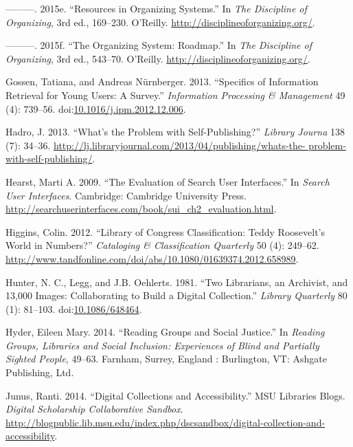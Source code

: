 \documentclass[]{article}
\begin{document}
\hypertarget{ref-glushkoux5fresourcesux5f2015}{}
---------. 2015e. ``Resources in Organizing Systems.'' In \emph{The
Discipline of Organizing}, 3rd ed., 169--230. O'Reilly.
\url{http://disciplineoforganizing.org/}.

\hypertarget{ref-glushkoux5forganizingux5f2015}{}
---------. 2015f. ``The Organizing System: Roadmap.'' In \emph{The
Discipline of Organizing}, 3rd ed., 543--70. O'Reilly.
\url{http://disciplineoforganizing.org/}.

\hypertarget{ref-gossenux5fspecificsux5f2013}{}
Gossen, Tatiana, and Andreas Nürnberger. 2013. ``Specifics of
Information Retrieval for Young Users: A Survey.'' \emph{Information
Processing \& Management} 49 (4): 739--56.
doi:\href{https://doi.org/10.1016/j.ipm.2012.12.006}{10.1016/j.ipm.2012.12.006}.

\hypertarget{ref-hadroux5fwhatsux5f2013}{}
Hadro, J. 2013. ``What's the Problem with Self-Publishing?''
\emph{Library Journa} 138 (7): 34--36.
\href{http://lj.libraryjournal.com/2013/04/publishing/whats-the-\%20problem-with-self-publishing/}{http://lj.libraryjournal.com/2013/04/publishing/whats-the- problem-with-self-publishing/}.

\hypertarget{ref-hearstux5fevaluationux5f2009}{}
Hearst, Marti A. 2009. ``The Evaluation of Search User Interfaces.'' In
\emph{Search User Interfaces}. Cambridge: Cambridge University Press.
\url{http://searchuserinterfaces.com/book/sui_ch2_evaluation.html}.

\hypertarget{ref-higginsux5flibraryux5f2012}{}
Higgins, Colin. 2012. ``Library of Congress Classification: Teddy
Roosevelt's World in Numbers?'' \emph{Cataloging \& Classification
Quarterly} 50 (4): 249--62.
\url{http://www.tandfonline.com/doi/abs/10.1080/01639374.2012.658989}.

\hypertarget{ref-hunterux5ftwoux5f1981}{}
Hunter, N. C., Legg, and J.B. Oehlerts. 1981. ``Two Librarians, an
Archivist, and 13,000 Images: Collaborating to Build a Digital
Collection.'' \emph{Library Quarterly} 80 (1): 81--103.
doi:\href{https://doi.org/10.1086/648464}{10.1086/648464}.

\hypertarget{ref-hyderux5freadingux5f2014}{}
Hyder, Eileen Mary. 2014. ``Reading Groups and Social Justice.'' In
\emph{Reading Groups, Libraries and Social Inclusion: Experiences of
Blind and Partially Sighted People}, 49--63. Farnham, Surrey, England :
Burlington, VT: Ashgate Publishing, Ltd.

\hypertarget{ref-junusux5fdigitalux5f2014}{}
Junus, Ranti. 2014. ``Digital Collections and Accessibility.'' MSU
Libraries Blogs. \emph{Digital Scholarship Collaborative Sandbox}.
\url{http://blogpublic.lib.msu.edu/index.php/dscsandbox/digital-collection-and-accessibility}.
\end{document}
